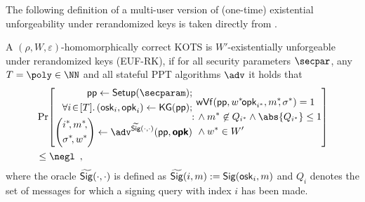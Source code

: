 The following definition of a multi-user version of (one-time) existential unforgeability under rerandomized keys is taken directly from \cite{CCS:FleSimZha22}.

\begin{definition}
  A $(\rho,W,\varepsilon)$-homomorphically correct KOTS is $W'$-existentially unforgeable under rerandomized keys (EUF-RK), if for all security parameters $\secpar$, any $T=\poly\in\NN$ and all stateful PPT algorithms $\adv$ it holds that
  \[
    \begin{aligned}
    &\Pr\mleft[
      \begin{aligned}
      \params \gets \setup(\secparam);\\
      \forall i \!\in\! [T]\ldotp (\osk_i,\opk_i) \gets \kgen(\params);\\
      \mleft(
      \begin{aligned}
      &i^*\!,m^*\!,\\&\sigma^*\!,w^*
      \end{aligned}
      \mright) 
      \gets \adv^{\widetilde\sign(\cdot,\cdot)}(\params,\vec{\opk})\\
      \end{aligned}\!\colon\!\!
      \begin{aligned}
      &\wverify(\params,w^{*\!}\opk_{i^*},m^*\!\!,\sigma^*) = 1\\
      &\land m^*\not\in Q_{i^*} \land \abs{Q_{i^*}}\leq 1\\
      &\land w^* \in W'
      \end{aligned}
    \mright]\\
    &\leq \negl\enspace,
    \end{aligned}
  \]
  where the oracle $\widetilde{\mathsf{Sig}}(\cdot,\cdot)$ is defined as $\widetilde{\mathsf{Sig}}(i,m) := \mathsf{Sig}(\mathsf{osk}_i,m)$ and $Q_i$ denotes the set of messages for which a signing query with index $i$ has been made.
\end{definition}

